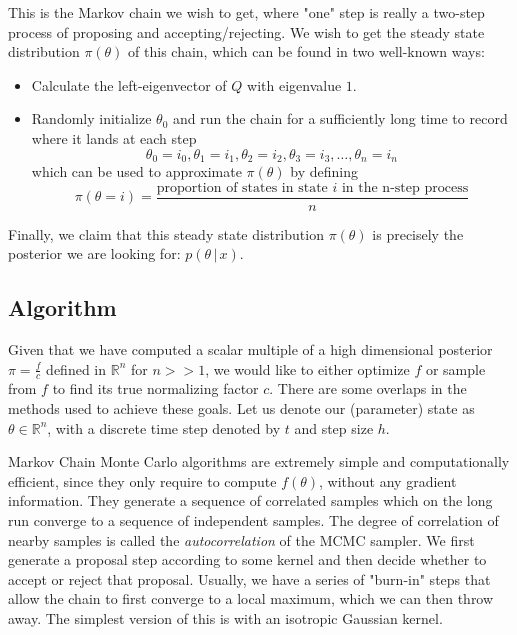   This is the Markov chain we wish to get, where "one" step is really a two-step process of proposing and accepting/rejecting. We wish to get the steady state distribution $\pi(\theta)$ of this chain, which can be found in two well-known ways:
  \begin{itemize}
    \item Calculate the left-eigenvector of $Q$ with eigenvalue $1$.
    \item Randomly initialize $\theta_0$ and run the chain for a sufficiently long time to record where it lands at each step
    \begin{equation}
      \theta_0 = i_0, \theta_1 = i_1, \theta_2 = i_2, \theta_3 = i_3, \ldots, \theta_n = i_n
    \end{equation}
    which can be used to approximate $\pi(\theta)$ by defining
    \begin{equation}
      \pi(\theta = i) = \frac{\text{proportion of states in state } i \text{ in the n-step process}}{n}
    \end{equation}
  \end{itemize}

  Finally, we claim that this steady state distribution $\pi(\theta)$ is precisely the posterior we are looking for: $p(\theta\,|\,x)$.

\subsection{Algorithm}

  Given that we have computed a scalar multiple of a high dimensional posterior $\pi = \frac{f}{c}$ defined in $\mathbb{R}^n$ for $n >> 1$, we would like to either optimize $f$ or sample from $f$ to find its true normalizing factor $c$. There are some overlaps in the methods used to achieve these goals. Let us denote our (parameter) state as $\theta \in \mathbb{R}^n$, with a discrete time step denoted by $t$ and step size $h$. 

  Markov Chain Monte Carlo algorithms are extremely simple and computationally efficient, since they only require to compute $f(\theta)$, without any gradient information. They generate a sequence of correlated samples which on the long run converge to a sequence of independent samples. The degree of correlation of nearby samples is called the \textit{autocorrelation} of the MCMC sampler. We first generate a proposal step according to some kernel and then decide whether to accept or reject that proposal. Usually, we have a series of "burn-in" steps that allow the chain to first converge to a local maximum, which we can then throw away. The simplest version of this is with an isotropic Gaussian kernel. 

